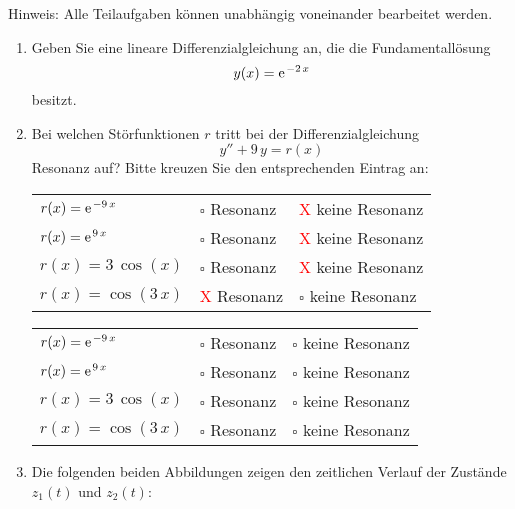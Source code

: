\begin{Aufgabe}[8]
Hinweis: Alle Teilaufgaben können unabhängig voneinander bearbeitet werden.

\begin{enumerate}
	\item
		Geben Sie eine lineare Differenzialgleichung an, die die Fundamentallösung
		\[
			y(x) = \e^{-2 \, x}
		\]
		besitzt.
		
	\item
		Bei welchen Störfunktionen $r$ tritt bei der Differenzialgleichung
		\[
			y'' + 9 \, y = r(x)
		\]
		Resonanz auf?
		Bitte kreuzen Sie den entsprechenden Eintrag an:
		
		\ifLoesung 
		\begin{tabular}{p{}p{}p{}}
			$r(x) = \e^{-9 \, x}$ & $\square$             Resonanz & {\textcolor{red}X} keine Resonanz\\
			$r(x) = \e^{  9 \, x}$ & $\square$             Resonanz & {\textcolor{red}X} keine Resonanz\\
			$r(x) = 3 \, \cos(x)$ & $\square$             Resonanz & {\textcolor{red}X} keine Resonanz\\
			$r(x) = \cos(3 \, x)$ & {\textcolor{red}X} Resonanz &            $\square$  keine Resonanz\\
		\end{tabular}
		\hfill{}
		\else
		\begin{tabular}{p{}p{}p{}}
			$r(x) = \e^{-9 \, x}$ & $\square$ Resonanz & $\square$ keine Resonanz\\
			$r(x) = \e^{  9 \, x}$ & $\square$ Resonanz & $\square$ keine Resonanz\\
			$r(x) = 3 \, \cos(x)$ & $\square$ Resonanz & $\square$ keine Resonanz\\
			$r(x) = \cos(3 \, x)$ & $\square$ Resonanz & $\square$ keine Resonanz\\
		\end{tabular}
		\fi
		
		\newpage
		
		\item
			Die folgenden beiden Abbildungen zeigen den zeitlichen Verlauf der Zustände $z_1(t)$ und $z_2(t)$:
			
			\newcommand{\zeins}[1]{1+exp(-0.5*#1)*cos(deg(3*#1))}
			\newcommand{\zzwei}[1]{-0.5*exp(-0.5*x)*cos(deg(3*x))-3*exp(-0.5*x)*sin(deg(3*x))}
			

\end{enumerate}
\end{Aufgabe}
